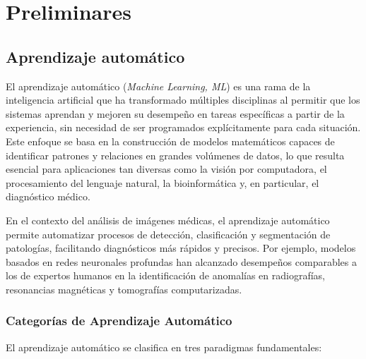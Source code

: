 \documentclass[11pt,spanish,listoffigures,listoftables]{tfgetsinf}
\begin{document}

\chapter{Preliminares}  %

\section{Aprendizaje automático}

El aprendizaje automático (\textit{Machine Learning, ML}) es una rama de la inteligencia artificial que ha transformado múltiples disciplinas al permitir que los sistemas aprendan y mejoren su desempeño en tareas específicas a partir de la experiencia, sin necesidad de ser programados explícitamente para cada situación. Este enfoque se basa en la construcción de modelos matemáticos capaces de identificar patrones y relaciones en grandes volúmenes de datos, lo que resulta esencial para aplicaciones tan diversas como la visión por computadora, el procesamiento del lenguaje natural, la bioinformática y, en particular, el diagnóstico médico.

En el contexto del análisis de imágenes médicas, el aprendizaje automático permite automatizar procesos de detección, clasificación y segmentación de patologías, facilitando diagnósticos más rápidos y precisos. Por ejemplo, modelos basados en redes neuronales profundas han alcanzado desempeños comparables a los de expertos humanos en la identificación de anomalías en radiografías, resonancias magnéticas y tomografías computarizadas.

\subsection{Categorías de Aprendizaje Automático}

El aprendizaje automático se clasifica en tres paradigmas fundamentales:
\end{document}
